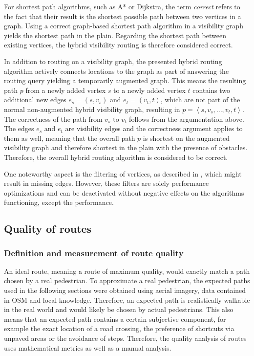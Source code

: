 		For shortest path algorithms, such as A* or Dijkstra, the term \emph{correct} refers to the fact that their result is the shortest possible path between two vertices in a graph.
		Using a correct graph-based shortest path algorithm in a visibility graph yields the shortest path in the plain.
		Regarding the shortest path between existing vertices, the hybrid visibility routing is therefore considered correct.
		
		In addition to routing on a visibility graph, the presented hybrid routing algorithm actively connects locations to the graph as part of answering the routing query yielding a temporarily augmented graph.
		This means the resulting path $p$ from a newly added vertex $s$ to a newly added vertex $t$ contains two additional new edges $e_s=(s, v_s)$ and $e_t=(v_t, t)$, which are not part of the normal non-augmented hybrid visibility graph, resulting in $p=\left\langle s, v_s, ..., v_t, t \right\rangle$.
		The correctness of the path from $v_s$ to $v_t$ follows from the argumentation above.
		The edges $e_s$ and $e_t$ are visibility edges and the correctness argument applies to them as well, meaning that the overall path $p$ is shortest on the augmented visibility graph and therefore shortest in the plain with the presence of obstacles.
		Therefore, the overall hybrid routing algorithm is considered to be correct.
		
		One noteworthy aspect is the filtering of vertices, as described in , which might result in missing edges.
		However, these filters are solely performance optimizations and can be deactivated without negative effects on the algorithms functioning, except the performance.
		
	\subsection{Quality of routes}
	
		\subsubsection{Definition and measurement of route quality}
	
			An ideal route, meaning a route of maximum quality, would exactly match a path chosen by a real pedestrian.
			To approximate a real pedestrian, the expected paths used in the following sections were obtained using aerial imagery, data contained in OSM and local knowledge.
			Therefore, an expected path is realistically walkable in the real world and would likely be chosen by actual pedestrians.
			This also means that an expected path contains a certain subjective component, for example the exact location of a road crossing, the preference of shortcuts via unpaved areas or the avoidance of steps.
			Therefore, the quality analysis of routes uses mathematical metrics as well as a manual analysis.
		
